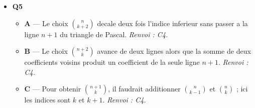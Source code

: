 \begin{itemize}
  \begin{itemize}
    \item \textbf{A} — Les classes de parties de cardinal $k$ sont disjointes et doivent être additionnees ; leur produit ne denombre pas leur reunion. \emph{Renvoi : C3.}
    \item \textbf{B} — La somme compte toutes les parties, pas seulement les $n$ singletons ; un ensemble a $n$ éléments possede $2^n$ parties. \emph{Renvoi : C3.}
    \item \textbf{D} — La somme $1+\cdots+n$ ne fait intervenir aucun coefficient binomial et vaut $n(n+1)/2$, pas $n!$ en general. \emph{Renvoi : C3.}
  \end{itemize}
  \item \textbf{Q5}
  \begin{itemize}
    \item \textbf{A} — Le choix $\binom{n}{k+2}$ decale deux fois l'indice inferieur sans passer a la ligne $n+1$ du triangle de Pascal. \emph{Renvoi : C4.}
    \item \textbf{B} — Le choix $\binom{n+2}{k}$ avance de deux lignes alors que la somme de deux coefficients voisins produit un coefficient de la seule ligne $n+1$. \emph{Renvoi : C4.}
    \item \textbf{C} — Pour obtenir $\binom{n+1}{k}$, il faudrait additionner $\binom{n}{k-1}$ et $\binom{n}{k}$ ; ici les indices sont $k$ et $k+1$. \emph{Renvoi : C4.}
  \end{itemize}
\end{itemize}
\fi
